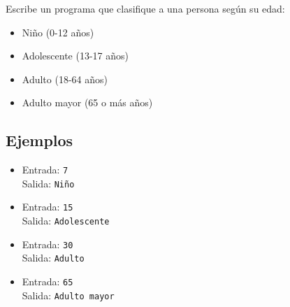Escribe un programa que clasifique a una persona según su edad:
\begin{itemize}
    \item Niño (0-12 años)
    \item Adolescente (13-17 años)
    \item Adulto (18-64 años)
    \item Adulto mayor (65 o más años)
\end{itemize}
\subsection*{Ejemplos}
\begin{itemize}
    \item Entrada: \texttt{7}\\
          Salida: \texttt{Niño}
    \item Entrada: \texttt{15}\\
          Salida: \texttt{Adolescente}
    \item Entrada: \texttt{30}\\
          Salida: \texttt{Adulto}
    \item Entrada: \texttt{65}\\
          Salida: \texttt{Adulto mayor}
\end{itemize}